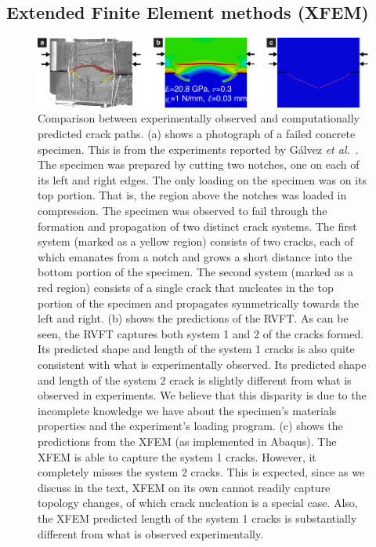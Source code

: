 \documentclass[10pt,letterpaper]{article}
\begin{document}
  \subsection{Extended Finite Element methods (XFEM)}
    \label{s:XFEM}
    \begin{figure}[h]
      \centering
      \includegraphics[width=\textwidth]{Figures/XFEM/concrete_ver4.pdf}
      \caption{\footnotesize Comparison between experimentally observed and computationally predicted crack paths. (a) shows a photograph of a failed concrete specimen. This is from the experiments reported by G{\'a}lvez \textit{et al.}~\cite{galvez1999fracture}.   The specimen was prepared by  cutting two notches, one  on each of its   left and right edges.  The only loading on the specimen was on its  top portion. That is,   the region above the notches was loaded in compression. The specimen was observed to fail through the formation and  propagation of two distinct crack systems.  The first system   (marked as a yellow region)  consists  of two cracks, each of which  emanates  from a  notch and  grows a short distance into the  bottom portion of the specimen. The second system (marked as a red region) consists  of a single crack that nucleates in the top portion of the specimen and propagates symmetrically towards the left and right.  (b) shows the predictions of the RVFT.  As can be seen, the RVFT captures both system 1 and 2 of the cracks formed. Its predicted shape and length of the  system 1 cracks is also quite consistent with what is experimentally observed.  Its  predicted shape and length of the system 2 crack is  slightly different from what is observed in experiments. We believe that this disparity is due to the incomplete knowledge we have about the specimen's materials properties and the experiment's loading program. (c) shows the predictions from the XFEM (as implemented in Abaqus). The XFEM is able to capture the system 1 cracks. However, it completely misses the  system 2 cracks. This is expected, since as we discuss in the text, XFEM on its own cannot readily capture  topology changes, of which crack nucleation is a special case. Also, the XFEM predicted length of the  system 1 cracks is substantially  different from what is observed experimentally. }
      \label{f:xfem}
    \end{figure}
\end{document}
